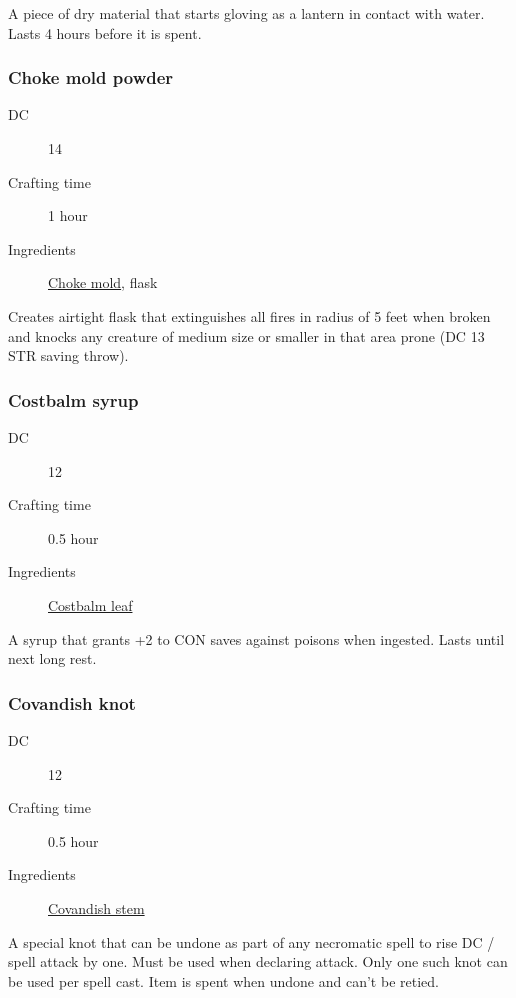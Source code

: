 A piece of dry material that starts gloving as a lantern in contact with water. Lasts 4 hours before it is spent.

\subsubsection{Choke mold powder}
\label{Choke mold powder}

\begin{description}
\item [DC] 14
\item [Crafting time] 1 hour
\item [Ingredients] \hyperref[Choke Mold]{Choke mold}, flask
\end{description}

Creates airtight flask that extinguishes all fires in radius of 5 feet when broken and knocks any creature of medium size or smaller in that area prone (DC 13 STR saving throw).

\subsubsection{Costbalm syrup}
\label{Costbalm syrup}

\begin{description}
\item [DC] 12
\item [Crafting time] 0.5 hour
\item [Ingredients] \hyperref[Cotsbalm]{Costbalm leaf}
\end{description}

A syrup that grants +2 to CON saves against poisons when ingested. Lasts until next long rest.

\subsubsection{Covandish knot}
\label{Covandish knot}

\begin{description}
\item [DC] 12
\item [Crafting time] 0.5 hour
\item [Ingredients] \hyperref[Covadish]{Covandish stem}
\end{description}

A special knot that can be undone as part of any necromatic spell to rise DC / spell attack by one. Must be used when declaring attack. 
Only one such knot can be used per spell cast. Item is spent when undone and can't be retied.

